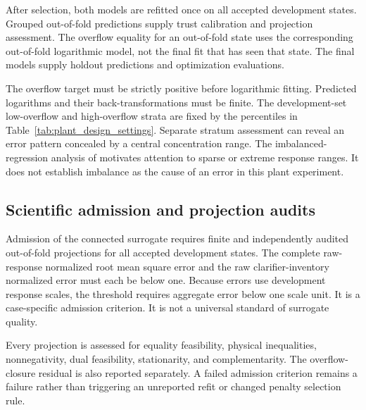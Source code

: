 After selection, both models are refitted once on all accepted development states. Grouped out-of-fold predictions supply trust calibration and projection assessment. The overflow equality for an out-of-fold state uses the corresponding out-of-fold logarithmic model, not the final fit that has seen that state. The final models supply holdout predictions and optimization evaluations.

The overflow target must be strictly positive before logarithmic fitting. Predicted logarithms and their back-transformations must be finite. The development-set low-overflow and high-overflow strata are fixed by the percentiles in Table~\ref{tab:plant_design_settings}. Separate stratum assessment can reveal an error pattern concealed by a central concentration range. The imbalanced-regression analysis of \citet{Shahbazi2026} motivates attention to sparse or extreme response ranges. It does not establish imbalance as the cause of an error in this plant experiment.

\subsection{Scientific admission and projection audits}

Admission of the connected surrogate requires finite and independently audited out-of-fold projections for all accepted development states. The complete raw-response normalized root mean square error and the raw clarifier-inventory normalized error must each be below one. Because errors use development response scales, the threshold requires aggregate error below one scale unit. It is a case-specific admission criterion. It is not a universal standard of surrogate quality.

Every projection is assessed for equality feasibility, physical inequalities, nonnegativity, dual feasibility, stationarity, and complementarity. The overflow-closure residual is also reported separately. A failed admission criterion remains a failure rather than triggering an unreported refit or changed penalty selection rule.

